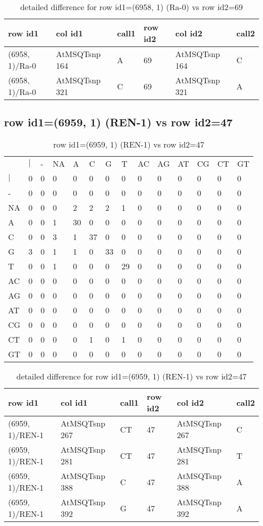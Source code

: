\begin{center}
\begin{longtable}{|l|l|l|l|l|l|}
\caption{detailed difference for row id1=(6958, 1) (Ra-0) vs row id2=69} \label{table_dm161}\\
\hline
row id1&col id1&call1&row id2&col id2&call2\\
\hline
(6958, 1)/Ra-0&AtMSQTsnp 164&A&69&AtMSQTsnp 164&C\\
(6958, 1)/Ra-0&AtMSQTsnp 321&C&69&AtMSQTsnp 321&A\\
\hline
\end{longtable}
\end{center}

\subsection{row id1=(6959, 1) (REN-1) vs row id2=47}
\begin{center}
\begin{longtable}{|l|l|l|l|l|l|l|l|l|l|l|l|l|l|}
\caption{row id1=(6959, 1) (REN-1) vs row id2=47} \label{table_dm162}\\
\hline
\\
\hline
&$|$&-&NA&A&C&G&T&AC&AG&AT&CG&CT&GT\\
$|$&0&0&0&0&0&0&0&0&0&0&0&0&0\\
-&0&0&0&0&0&0&0&0&0&0&0&0&0\\
NA&0&0&0&2&2&2&1&0&0&0&0&0&0\\
A&0&0&1&30&0&0&0&0&0&0&0&0&0\\
C&0&0&3&1&37&0&0&0&0&0&0&0&0\\
G&3&0&1&1&0&33&0&0&0&0&0&0&0\\
T&0&0&1&0&0&0&29&0&0&0&0&0&0\\
AC&0&0&0&0&0&0&0&0&0&0&0&0&0\\
AG&0&0&0&0&0&0&0&0&0&0&0&0&0\\
AT&0&0&0&0&0&0&0&0&0&0&0&0&0\\
CG&0&0&0&0&0&0&0&0&0&0&0&0&0\\
CT&0&0&0&0&1&0&1&0&0&0&0&0&0\\
GT&0&0&0&0&0&0&0&0&0&0&0&0&0\\
\hline
\end{longtable}
\end{center}

\begin{center}
\begin{longtable}{|l|l|l|l|l|l|}
\caption{detailed difference for row id1=(6959, 1) (REN-1) vs row id2=47} \label{table_dm163}\\
\hline
row id1&col id1&call1&row id2&col id2&call2\\
\hline
(6959, 1)/REN-1&AtMSQTsnp 267&CT&47&AtMSQTsnp 267&C\\
(6959, 1)/REN-1&AtMSQTsnp 281&CT&47&AtMSQTsnp 281&T\\
(6959, 1)/REN-1&AtMSQTsnp 388&C&47&AtMSQTsnp 388&A\\
(6959, 1)/REN-1&AtMSQTsnp 392&G&47&AtMSQTsnp 392&A\\
\hline
\end{longtable}
\end{center}

